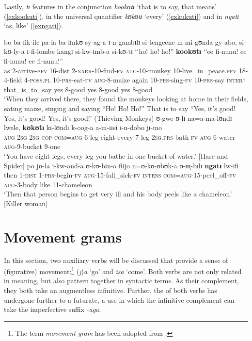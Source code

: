 Lastly, \textit{tɪ} features in the conjunction \textit{kookʊtɪ} `that is to say, that means' (\ref{exkookuti}), in the universal quantifier \textit{kʊkʊtɪ} `every' (\ref{exkukuti}) and in \textit{ngatɪ} `as, like' (\ref{exngati}). 

\begin{exe}
\ex \label{exkookuti}
\gll bo ba-fik-ile pa-la ba-lɪnkʊ-sy-ag-a ɪ-n-gambɪlɪ si-tengeene m-mi-gʊnda gy-abo, si-kʊ-ly-a ɪ-fi-lombe kangɪ si-kw-ɪmb-a si-kʊ-tɪ \textup{\lq\lq}{ho! ho! ho!}\textup{''} \textbf{kookʊtɪ} \textup{\lq\lq}ee fi-nunu! ee fi-nunu! ee fi-nunu!\textup{''}\\
as 2-arrive-\textsc{pfv} 16-{dist} 2-\textsc{narr}-10-find-\textsc{fv} \textsc{aug}-10-monkey 10-live\_in\_peace.\textsc{pfv} 18-4-field 4-\textsc{poss.pl} 10-\textsc{prs}-eat-\textsc{fv} \textsc{aug}-8-maize again 10-\textsc{prs}-sing-\textsc{fv} 10-\textsc{prs}-say \phantom{\lq\lq}\textsc{interj} that\_is\_to\_say \phantom{\lq\lq}yes 8-good yes 8-good yes 8-good\\
\glt `When they arrived there, they found the monkeys looking at home in their fields, eating maize, singing and saying ``Ho! Ho! Ho!'' That is to say ``Yes, it's good! Yes, it's good! Yes, it's good!' (Thieving Monkeys)
\ex \label{exkukuti} \gll ʊ-gwe ʊ-lɪ na=a-ma-lʊndɪ lwele, \textbf{kʊkʊtɪ} kɪ-lʊndɪ k-oog-a a-m-ɪɪsi ɪ-n-dobo jɪ-mo\\
\textsc{aug}-\textsc{2sg} \textsc{2sg}-\textsc{cop} \textsc{com}=\textsc{aug}-6-leg eight every 7-leg \textsc{2sg.prs}-bath-\textsc{fv} \textsc{aug}-6-water \textsc{aug}-9-bucket 9-one\\
\glt `You have eight legs, every leg you bathe in one bucket of water.' [Hare and Spider]
\ex \label{exngati}
\gll po jʊ-la i-kw-and-a ʊ-kʊ-bin-a fiijo n=ʊ-kʊ-ʊbʊk-a ʊ-m̩-bɪlɪ \textbf{ngatɪ} lw-ifi\\
then 1-\textsc{dist} 1-\textsc{prs}-begin-\textsc{fv} \textsc{aug}-15-fall\_sick-\textsc{fv} \textsc{intens} \textsc{com}=\textsc{aug}-15-peel\_off-\textsc{fv} \textsc{aug}-3-body like 11-chameleon\\
\glt \lq Then that person begins to get very ill and his body peels like a chameleon.' [Killer woman]
\end{exe}
\section{Movement grams}\label{MovementGrams}
In this section, two auxiliary verbs will be discussed that provide a sense of (figurative) movement:\footnote{The term \textit{movement gram} has been adopted from \citet{NicolleS2002}.} (\textit{j})\textit{a} `go' and \textit{isa} `come'. Both verbs are not only related in meaning, but also pattern together in syntactic terms. As their complement, they both take an augmentless infinitive. Further, the  of both verbs has undergone further  to a futurate, a use in which the infinitive complement can take the imperfective suffix -\textit{aga}. 

